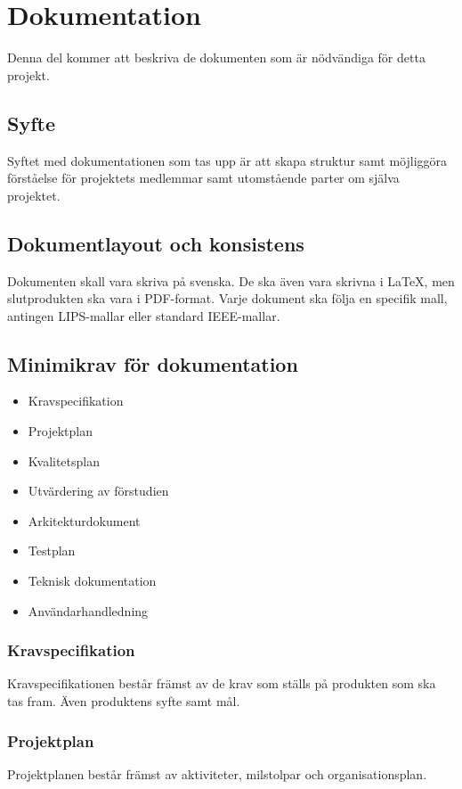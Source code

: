 \section{Dokumentation}
Denna del kommer att beskriva de dokumenten som är nödvändiga för detta projekt. 
\subsection{Syfte}
Syftet med dokumentationen som tas upp är att skapa struktur samt möjliggöra förståelse för projektets medlemmar samt utomstående parter om själva projektet.

\subsection{Dokumentlayout och konsistens}
Dokumenten skall vara skriva på svenska. De ska även vara skrivna i \LaTeX, men slutprodukten ska vara i PDF-format. Varje dokument ska följa en specifik mall, antingen LIPS-mallar eller standard IEEE-mallar. 

\subsection{Minimikrav för dokumentation}
\begin{itemize}
\item Kravspecifikation
\item Projektplan
\item Kvalitetsplan
\item Utvärdering av förstudien
\item Arkitekturdokument
\item Testplan
\item Teknisk dokumentation
\item Användarhandledning
\end{itemize}

\subsubsection{Kravspecifikation}
Kravspecifikationen består främst av de krav som ställs på produkten som ska tas fram. Även produktens syfte samt mål.

\subsubsection{Projektplan}
Projektplanen består främst av aktiviteter, milstolpar och organisationsplan. 

